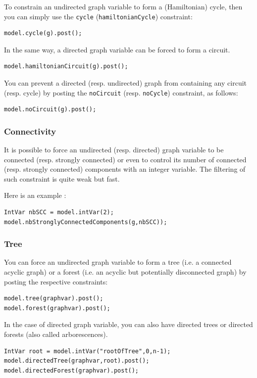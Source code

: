 \documentclass{article}
\begin{document}
To constrain an undirected graph variable to form a (Hamiltonian) cycle, then you can simply use the \texttt{cycle} (\texttt{hamiltonianCycle}) constraint: 
\begin{lstlisting}
model.cycle(g).post();
\end{lstlisting} 
In the same way, a directed graph variable can be forced to form a circuit.
\begin{lstlisting}
model.hamiltonianCircuit(g).post();
\end{lstlisting} 

You can prevent a directed (resp. undirected) graph from containing any circuit (resp. cycle) by posting the \texttt{noCircuit} (resp. \texttt{noCycle}) constraint, as follows:
\begin{lstlisting}
model.noCircuit(g).post();
\end{lstlisting}


\subsubsection{Connectivity}

It is possible to force an undirected (resp. directed) graph variable to be connected (resp. strongly connected) \cite{Tarjan72} or even to control its number of connected (resp. strongly connected) components with an integer variable. The filtering of such constraint is quite weak but fast.

Here is an example :
\begin{lstlisting}
IntVar nbSCC = model.intVar(2);
model.nbStronglyConnectedComponents(g,nbSCC));
\end{lstlisting}

\subsubsection{Tree}

You can force an undirected graph variable to form a tree (i.e. a connected acyclic graph) or a forest (i.e. an acyclic but potentially disconnected graph) by posting the respective constraints: 
\begin{lstlisting}
model.tree(graphvar).post();
model.forest(graphvar).post();
\end{lstlisting}

In the case of directed graph variable, you can also have directed trees or directed forests (also called arborescences). 
\begin{lstlisting}
IntVar root = model.intVar("rootOfTree",0,n-1);
model.directedTree(graphvar,root).post();
model.directedForest(graphvar).post();
\end{lstlisting}
\end{document}
